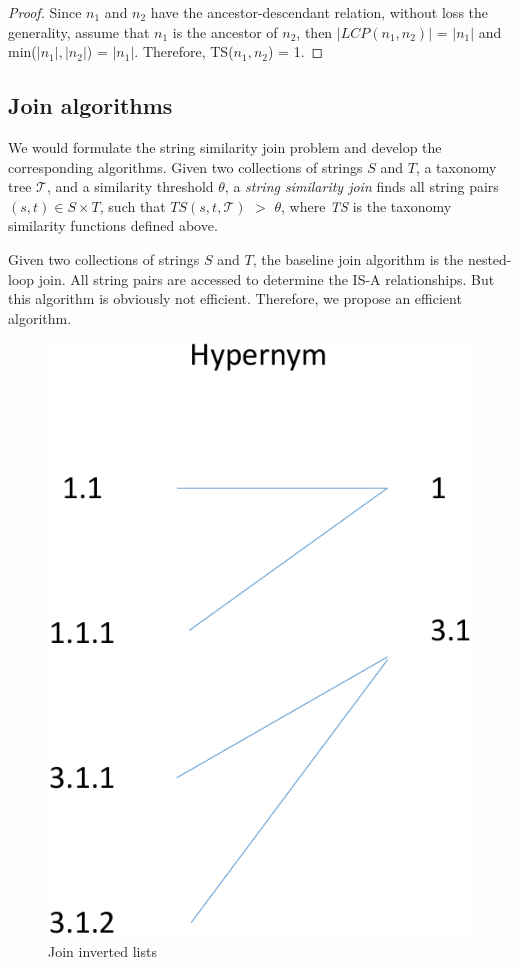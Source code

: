 \begin{proof} Since $n_1$ and $n_2$ have the ancestor-descendant relation, without loss the generality, assume that $n_1$ is the ancestor of $n_2$, then $|LCP(n_1,n_2)|$ = $|n_1|$ and min($|n_1|,|n_2|$) = $|n_1|$. Therefore, TS($n_1,n_2$) = 1.
\end{proof}


\subsection{Join algorithms}


We would formulate the string similarity join problem and develop the corresponding algorithms. Given two collections of strings $S$ and $T$, a taxonomy tree
$\mathcal{T}$, and a similarity threshold $\theta$, a \textit{string
  similarity join} finds all string pairs $(s, t) \in S \times T$,
such that $TS(s,t,\mathcal{T})$ $>$ $\theta$, where \textit{TS} is
 the taxonomy similarity functions defined above.



Given two collections of strings $S$ and $T$, the baseline join algorithm is the nested-loop join. All string pairs are accessed to determine the IS-A relationships. But this algorithm is obviously not efficient. Therefore, we propose an efficient algorithm.



\begin{figure}[t]
\centering
\includegraphics[scale=0.4]{figures/labeljoins}
 \caption{Join inverted lists}
\label{fig:invertedlist}
\end{figure}


